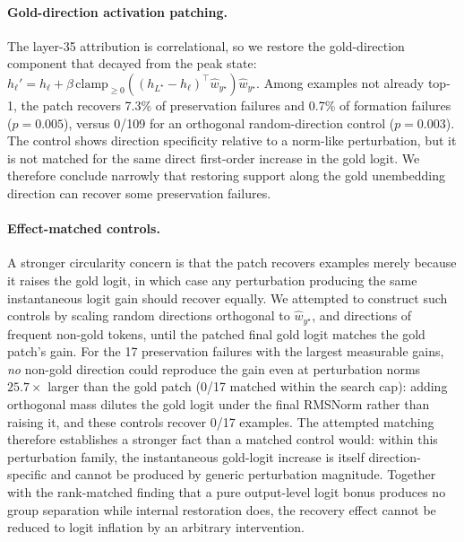 \documentclass{article} %
\begin{document}
\paragraph{Gold-direction activation patching.}
\label{sec:causal-patch}
The layer-35 attribution is correlational, so we restore the gold-direction component that decayed from the peak state:
$h_\ell'=h_\ell+\beta\,\mathrm{clamp}_{\ge0}((h_{L^\star}-h_\ell)^\top\hat w_{y^\star})\hat w_{y^\star}$.
Among examples not already top-1, the patch recovers 7.3\% of preservation failures and 0.7\% of formation failures ($p=0.005$), versus 0/109 for an orthogonal random-direction control ($p=0.003$). The control shows direction specificity relative to a norm-like perturbation, but it is not matched for the same direct first-order increase in the gold logit. We therefore conclude narrowly that restoring support along the gold unembedding direction can recover some preservation failures.

\paragraph{Effect-matched controls.}
A stronger circularity concern is that the patch recovers examples merely because it raises the gold logit, in which case any perturbation producing the same instantaneous logit gain should recover equally. We attempted to construct such controls by scaling random directions orthogonal to $\hat w_{y^\star}$, and directions of frequent non-gold tokens, until the patched final gold logit matches the gold patch's gain. For the 17 preservation failures with the largest measurable gains, \emph{no} non-gold direction could reproduce the gain even at perturbation norms $25.7\times$ larger than the gold patch (0/17 matched within the search cap): adding orthogonal mass dilutes the gold logit under the final RMSNorm rather than raising it, and these controls recover 0/17 examples. The attempted matching therefore establishes a stronger fact than a matched control would: within this perturbation family, the instantaneous gold-logit increase is itself direction-specific and cannot be produced by generic perturbation magnitude. Together with the rank-matched finding that a pure output-level logit bonus produces no group separation while internal restoration does, the recovery effect cannot be reduced to logit inflation by an arbitrary intervention.
\end{document}
